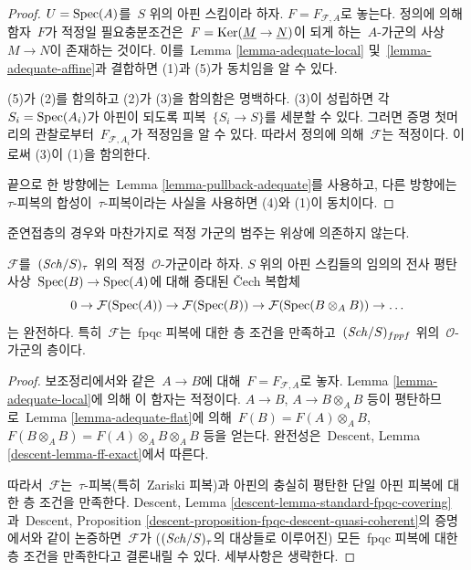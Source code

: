 \begin{proof}
$U = \mathop{\mathrm{Spec}}(A)$를\  $S$ 위의 아핀 스킴이라 하자.
$F = F_{\mathcal{F}, A}$로 놓는다. 정의에 의해 함자\  $F$가 적정일
필요충분조건은\  $F = \mathop{\mathrm{Ker}}(\underline{M} \to \underline{N})$이
되게 하는\  $A$-가군의 사상\  $M \to N$이 존재하는 것이다.
이를\  Lemma \ref{lemma-adequate-local} 및\ 
\ref{lemma-adequate-affine}과 결합하면 (1)과 (5)가 동치임을 알 수 있다.

\medskip\noindent
(5)가 (2)를 함의하고 (2)가 (3)을 함의함은 명백하다. (3)이
성립하면 각\  $S_i = \mathop{\mathrm{Spec}}(A_i)$가 아핀이 되도록 피복\ 
$\{S_i \to S\}$를 세분할 수 있다. 그러면 증명 첫머리의 관찰로부터\ 
$F_{\mathcal{F}, A_i}$가 적정임을 알 수 있다. 따라서 정의에 의해\ 
$\mathcal{F}$는 적정이다. 이로써 (3)이 (1)을 함의한다.

\medskip\noindent
끝으로 한 방향에는\  Lemma \ref{lemma-pullback-adequate}를 사용하고,
다른 방향에는\  $\tau$-피복의 합성이\  $\tau$-피복이라는 사실을
사용하면 (4)와 (1)이 동치이다.
\end{proof}

\noindent
준연접층의 경우와 마찬가지로 적정 가군의 범주는 위상에 의존하지 않는다.

\begin{lemma}
\label{lemma-adequate-fpqc}
$\mathcal{F}$를\  $(\mathit{Sch}/S)_\tau$ 위의 적정\  $\mathcal{O}$-가군이라
하자. $S$ 위의 아핀 스킴들의 임의의 전사 평탄 사상\ 
$\mathop{\mathrm{Spec}}(B) \to \mathop{\mathrm{Spec}}(A)$에 대해 증대된 {\v C}ech 복합체
$$
0 \to \mathcal{F}(\mathop{\mathrm{Spec}}(A)) \to
\mathcal{F}(\mathop{\mathrm{Spec}}(B)) \to
\mathcal{F}(\mathop{\mathrm{Spec}}(B \otimes_A B)) \to \ldots
$$
는 완전하다. 특히\  $\mathcal{F}$는\  fpqc 피복에 대한 층 조건을
만족하고\  $(\mathit{Sch}/S)_{fppf}$ 위의\  $\mathcal{O}$-가군의 층이다.
\end{lemma}

\begin{proof}
보조정리에서와 같은\  $A \to B$에 대해\ 
$F = F_{\mathcal{F}, A}$로 놓자. Lemma
\ref{lemma-adequate-local}에 의해 이 함자는 적정이다. $A \to B$,
$A \to B \otimes_A B$ 등이 평탄하므로\  Lemma
\ref{lemma-adequate-flat}에 의해\ 
$F(B) = F(A) \otimes_A B$,
$F(B \otimes_A B) = F(A) \otimes_A B \otimes_A B$ 등을 얻는다.
완전성은\  Descent, Lemma \ref{descent-lemma-ff-exact}에서 따른다.

\medskip\noindent
따라서\  $\mathcal{F}$는\  $\tau$-피복(특히\  Zariski 피복)과 아핀의
충실히 평탄한 단일 아핀 피복에 대한 층 조건을 만족한다.
Descent, Lemma \ref{descent-lemma-standard-fpqc-covering}과\ 
Descent, Proposition
\ref{descent-proposition-fpqc-descent-quasi-coherent}의 증명에서와 같이
논증하면\  $\mathcal{F}$가 ($(\mathit{Sch}/S)_\tau$의 대상들로 이루어진)
모든\  fpqc 피복에 대한 층 조건을 만족한다고 결론내릴 수 있다.
세부사항은 생략한다.
\end{proof}

